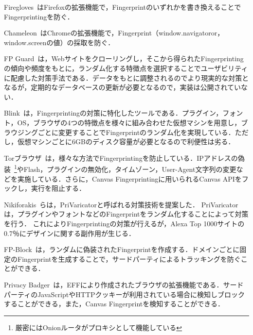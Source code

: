 Firegloves~\cite{firegloves}はFirefoxの拡張機能で，Fingerprintのいずれかを書き換えることでFingerprintingを防ぐ．

Chameleon~\cite{chamereon}はChromeの拡張機能で，Fingerprint（window.navigatoror，window.screenの値）の採取を防ぐ．

FP Guard~\cite{faizkhademi2015fpguard}は，Webサイトをクローリングし，そこから得られたFingerprintingの傾向や頻度をもとに，ランダム化する特徴点を選択することでユーザビリティに配慮した対策手法である．データをもとに調整されるのでより現実的な対策となるが，定期的なデータベースの更新が必要となるので，実装は公開されていない．

Blink~\cite{blink}は，Fingerprintingの対策に特化したツールである．プラグイン，フォント，OS，ブラウザの4つの特徴点を様々に組み合わせた仮想マシンを用意し，ブラウジングごとに変更することでFingerprintのランダム化を実現している．ただし，仮想マシンごとに6GBのディスク容量が必要となるので利便性は劣る．

Torブラウザ~\cite{tor}は，様々な方法でFingerprintingを防止している．IPアドレスの偽装~\footnote{厳密にはOnionルータがプロキシとして機能している}やFlash，プラグインの無効化，タイムゾーン，User-Agent文字列の変更などを実施している．さらに，Canvas Fingerprintingに用いられるCanvas APIをフックし，実行を阻止する．

Nikiforakis~\cite{nikiforakis2015privaricator}らは，PriVaricatorと呼ばれる対策技術を提案した．
PriVaricatorは，プラグインやフォントなどのFingerprintをランダム化することによって対策を行う．
これによりFingerprintingの対策が行えるが，Alexa Top 1000サイトの0.7％にデザインに関する副作用が生じる．

FP-Block~\cite{torres2015fp}は，ランダムに偽装されたFingerprintを作成する．ドメインごとに固定のFingerprintを生成することで，サードパーティによるトラッキングを防ぐことができる．

Privacy Badger~\cite{privacybadger}は，EFFにより作成されたブラウザの拡張機能である．サードパーティのJavaScriptやHTTPクッキーが利用されている場合に検知しブロックすることができる，また，Canvas Fingerprintを検知することができる．
